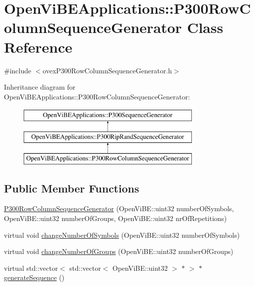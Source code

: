 \hypertarget{classOpenViBEApplications_1_1P300RowColumnSequenceGenerator}{
\section{OpenViBEApplications::P300RowColumnSequenceGenerator Class Reference}
\label{classOpenViBEApplications_1_1P300RowColumnSequenceGenerator}
}


{\ttfamily \#include $<$ovexP300RowColumnSequenceGenerator.h$>$}

Inheritance diagram for OpenViBEApplications::P300RowColumnSequenceGenerator:\begin{figure}[H]
\begin{center}
\leavevmode
\includegraphics[height=3.000000cm]{classOpenViBEApplications_1_1P300RowColumnSequenceGenerator}
\end{center}
\end{figure}
\subsection*{Public Member Functions}
\begin{DoxyCompactItemize}
\item 
\hyperlink{classOpenViBEApplications_1_1P300RowColumnSequenceGenerator_ab6715b84589671576dbedd900561db34}{P300RowColumnSequenceGenerator} (OpenViBE::uint32 numberOfSymbols, OpenViBE::uint32 numberOfGroups, OpenViBE::uint32 nrOfRepetitions)
\item 
virtual void \hyperlink{classOpenViBEApplications_1_1P300RowColumnSequenceGenerator_a247bf27e9f76d6127688e425e25b018b}{changeNumberOfSymbols} (OpenViBE::uint32 numberOfSymbols)
\item 
virtual void \hyperlink{classOpenViBEApplications_1_1P300RowColumnSequenceGenerator_a25c3a52a4e2bf3907f3cf2f2efc0923c}{changeNumberOfGroups} (OpenViBE::uint32 numberOfGroups)
\item 
virtual std::vector$<$ std::vector$<$ OpenViBE::uint32 $>$ $\ast$ $>$ $\ast$ \hyperlink{classOpenViBEApplications_1_1P300RowColumnSequenceGenerator_ae6c55f653e229ffa3083b7c238451ee5}{generateSequence} ()
\end{DoxyCompactItemize}
